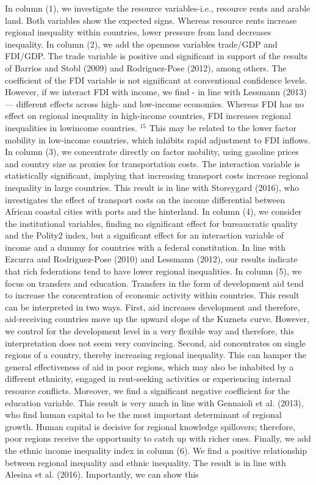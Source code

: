 \documentclass[10pt]{article}
\begin{document}
In column (1), we investigate the resource variables-i.e., resource rents and arable land. Both variables show the expected signs. Whereas resource rents increase regional inequality within countries, lower pressure from land decreases inequality. In column (2), we add the openness variables trade/GDP and FDI/GDP. The trade variable is positive and significant in support of the results of Barrios and Stobl (2009) and Rodriguez-Pose (2012), among others. The coefficient of the FDI variable is not significant at conventional confidence levels. However, if we interact FDI with income, we find - in line with Lessmann (2013) — different effects across high- and low-income economies. Whereas FDI has no effect on regional inequality in high-income countries, FDI increases regional inequalities in lowincome countries. ${ }^{15}$ This may be related to the lower factor mobility in low-income countries, which inhibits rapid adjustment to FDI inflows. In column (3), we concentrate directly on factor mobility, using gasoline prices and country size as proxies for transportation costs. The interaction variable is statistically significant, implying that increasing transport costs increase regional inequality in large countries. This result is in line with Storeygard (2016), who investigates the effect of transport costs on the income differential between African coastal cities with ports and the hinterland. In column (4), we consider the institutional variables, finding no significant effect for bureaucratic quality and the Polity2 index, but a significant effect for an interaction variable of income and a dummy for countries with a federal constitution. In line with Ezcurra and Rodriguez-Pose (2010) and Lessmann (2012), our results indicate that rich federations tend to have lower regional inequalities. In column (5), we focus on transfers and education. Transfers in the form of development aid tend to increase the concentration of economic activity within countries. This result can be interpreted in two ways. First, aid increases development and therefore, aid-receiving countries move up the upward slope of the Kuznets curve. However, we control for the development level in a very flexible way and therefore, this interpretation does not seem very convincing. Second, aid concentrates on single regions of a country, thereby increasing regional inequality. This can hamper the general effectiveness of aid in poor regions, which may also be inhabited by a different ethnicity, engaged in rent-seeking activities or experiencing internal resource conflicts. Moreover, we find a significant negative coefficient for the education variable. This result is very much in line with Gennaioli et al. (2013), who find human capital to be the most important determinant of regional growth. Human capital is decisive for regional knowledge spillovers; therefore, poor regions receive the opportunity to catch up with richer ones. Finally, we add the ethnic income inequality index in column (6). We find a positive relationship between regional inequality and ethnic inequality. The result is in line with Alesina et al. (2016). Importantly, we can show this
\end{document}
